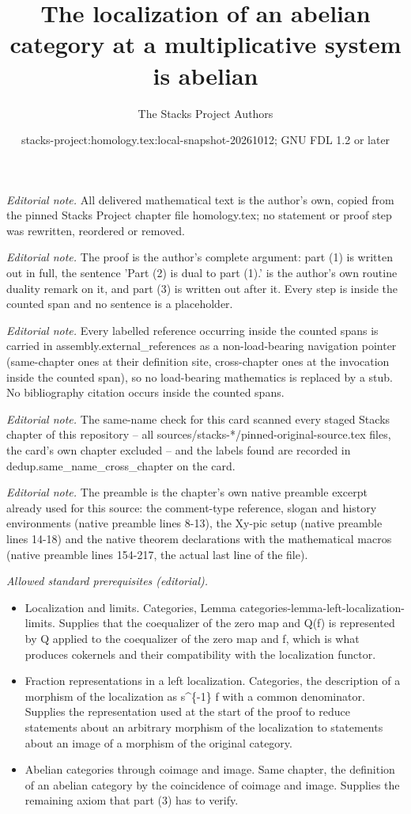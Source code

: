 \documentclass[10pt,a4paper]{amsart}
\title{The localization of an abelian category at a multiplicative system is abelian}
\author{The Stacks Project Authors}
\date{stacks-project:homology.tex:local-snapshot-20261012; GNU FDL 1.2 or later}
\theoremstyle{plain}
\theoremstyle{definition}
\theoremstyle{remark}
\numberwithin{equation}{subsection}
\begin{document}
\maketitle
\noindent\textit{Editorial note.} All delivered mathematical text is the author's own, copied from the pinned Stacks Project chapter file homology.tex; no statement or proof step was rewritten, reordered or removed.\par\medskip
\noindent\textit{Editorial note.} The proof is the author's complete argument: part (1) is written out in full, the sentence 'Part (2) is dual to part (1).' is the author's own routine duality remark on it, and part (3) is written out after it. Every step is inside the counted span and no sentence is a placeholder.\par\medskip
\noindent\textit{Editorial note.} Every labelled reference occurring inside the counted spans is carried in assembly.external\_references as a non-load-bearing navigation pointer (same-chapter ones at their definition site, cross-chapter ones at the invocation inside the counted span), so no load-bearing mathematics is replaced by a stub. No bibliography citation occurs inside the counted spans.\par\medskip
\noindent\textit{Editorial note.} The same-name check for this card scanned every staged Stacks chapter of this repository -- all sources/stacks-*/pinned-original-source.tex files, the card's own chapter excluded -- and the labels found are recorded in dedup.same\_name\_cross\_chapter on the card.\par\medskip
\noindent\textit{Editorial note.} The preamble is the chapter's own native preamble excerpt already used for this source: the comment-type reference, slogan and history environments (native preamble lines 8-13), the Xy-pic setup (native preamble lines 14-18) and the native theorem declarations with the mathematical macros (native preamble lines 154-217, the actual last line of the file).\par\medskip
\noindent\textit{Allowed standard prerequisites (editorial).}\begin{itemize}
\item Localization and limits. Categories, Lemma categories-lemma-left-localization-limits. Supplies that the coequalizer of the zero map and Q(f) is represented by Q applied to the coequalizer of the zero map and f, which is what produces cokernels and their compatibility with the localization functor.
\item Fraction representations in a left localization. Categories, the description of a morphism of the localization as s\textasciicircum{}\{-1\} f with a common denominator. Supplies the representation used at the start of the proof to reduce statements about an arbitrary morphism of the localization to statements about an image of a morphism of the original category.
\item Abelian categories through coimage and image. Same chapter, the definition of an abelian category by the coincidence of coimage and image. Supplies the remaining axiom that part (3) has to verify.
\end{itemize}\medskip
\end{document}
